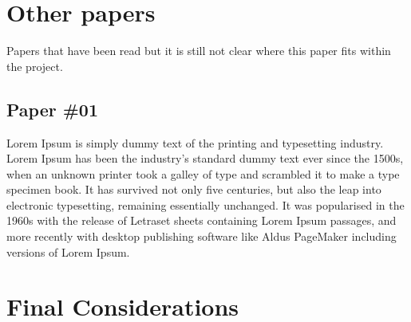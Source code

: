\section{Other papers}

Papers that have been read but it is still not clear where this paper fits within the project.

\subsection{Paper \#01}

Lorem Ipsum is simply dummy text of the printing and typesetting industry. Lorem Ipsum has been the industry's standard dummy text ever since the 1500s, when an unknown printer took a galley of type and scrambled it to make a type specimen book. It has survived not only five centuries, but also the leap into electronic typesetting, remaining essentially unchanged. It was popularised in the 1960s with the release of Letraset sheets containing Lorem Ipsum passages, and more recently with desktop publishing software like Aldus PageMaker including versions of Lorem Ipsum.

\section{Final Considerations}
